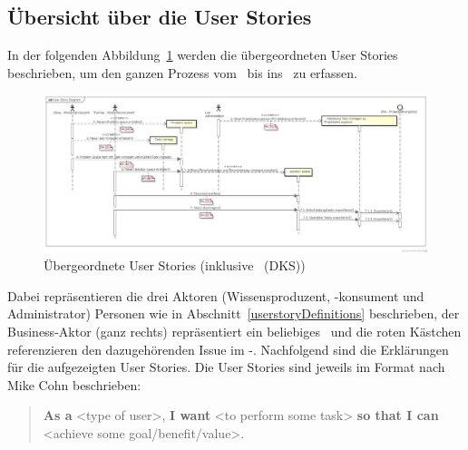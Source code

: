 		
	\begin{landscape}
	\subsection{Übersicht über die User Stories}
	
		In der folgenden Abbildung~\ref{fig:UserStoryDiagram} werden die übergeordneten User Stories beschrieben, um den ganzen Prozess vom \dks\ bis ins \ppt\ zu erfassen.
	
		\begin{figure}[H]
				\includegraphics[width=0.95\linewidth]{media/diagrams/UserStoryDiagram.png}
				\centering
				\caption{Übergeordnete User Stories (inklusive \dks\ (DKS))}
				\label{fig:UserStoryDiagram}
		\end{figure}
		
		Dabei repräsentieren die drei Aktoren (Wissensproduzent, -konsument und Administrator) Personen wie in Abschnitt~\ref{userstoryDefinitions} beschrieben,
		der Business-Aktor (ganz rechts) repräsentiert ein beliebiges \ppt\ und die roten Kästchen referenzieren den dazugehörenden Issue im \eeppi-\ppt.
		Nachfolgend sind die Erklärungen für die aufgezeigten User Stories.
		Die User Stories sind jeweils im Format nach Mike Cohn \cite{rasmusson_agile_2012} beschrieben:
		\begin{quote}
			\textbf{As a} <type of user>,\newline
			\textbf{I want} <to perform some task>\newline
			\textbf{so that I can} <achieve some goal/benefit/value>.
		\end{quote}
	\end{landscape}
	
		
			
		
			
